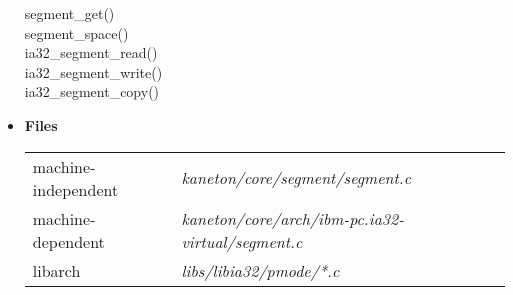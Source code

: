 \begin{itemize}
    segment\_get()\\
    segment\_space()\\

    ia32\_segment\_read()\\
    ia32\_segment\_write()\\
    ia32\_segment\_copy()\\

  \item {\bf {Files}}\\

    \begin{tabular}{| l | l |}
      \hline
      machine-independent & {\em kaneton/core/segment/segment.c}\\
      machine-dependent & {\em kaneton/core/arch/ibm-pc.ia32-virtual/segment.c}\\
      libarch & {\em libs/libia32/pmode/*.c}\\\hline
    \end{tabular}
\end{itemize}


%
%

\newpage

